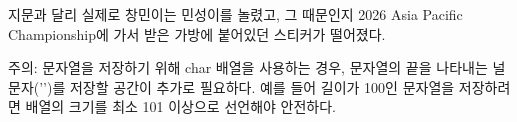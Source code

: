 지문과 달리 실제로 창민이는 민성이를 놀렸고, 그 때문인지 2026 Asia Pacific Championship에 가서 받은 가방에 붙어있던 스티커가 떨어졌다. 

주의: 문자열을 저장하기 위해 char 배열을 사용하는 경우, 문자열의 끝을 나타내는 널 문자('\0')를 저장할 공간이 추가로 필요하다. 예를 들어 길이가 100인 문자열을 저장하려면 배열의 크기를 최소 101 이상으로 선언해야 안전하다.